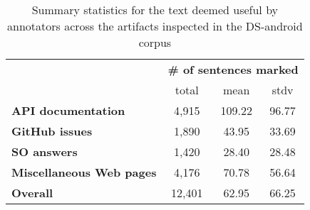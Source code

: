 \begin{table}[H]
\centering    
\caption{Summary statistics for the text deemed useful by annotators across the artifacts inspected in the \acs{DS-android} corpus}
\label{tbl:corpus-annotation-summary}
\begin{scriptsize}
\begin{threeparttable}
\begin{tabular}{lccc}





& \multicolumn{3}{c}{\textbf{\# of sentences marked}}
\\ \cmidrule(l){2-4} 
& total & mean & stdv  \\

\hline

\textbf{API documentation} 
& 4,915 & 109.22 & 96.77
\\
\textbf{GitHub issues} 
& 1,890 &  43.95 & 33.69
\\
\textbf{SO answers} 
& 1,420 & 28.40 & 28.48 
\\
\textbf{Miscellaneous Web pages} 
& 4,176 & 70.78 & 56.64 
\\

\hline
\textbf{Overall} 
& 12,401 & 62.95 & 66.25 
\\
\hline

\end{tabular}
\end{threeparttable}
\end{scriptsize}
\end{table}

